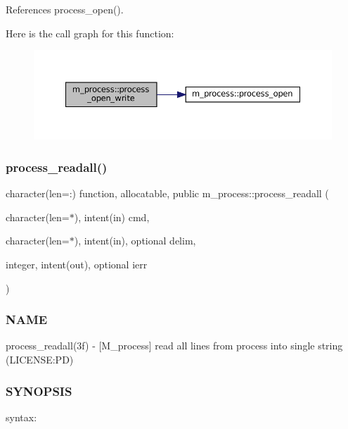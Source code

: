 References process\+\_\+open().

Here is the call graph for this function\+:
\nopagebreak
\begin{figure}[H]
\begin{center}
\leavevmode
\includegraphics[width=350pt]{namespacem__process_aa6ed1404ab3472f5068ed15a7a01defc_cgraph}
\end{center}
\end{figure}
\mbox{\label{namespacem__process_a7dd759a1344789477ae1e205d7fa9a51}} 
\subsubsection{\texorpdfstring{process\+\_\+readall()}{process\_readall()}}
{\footnotesize\ttfamily character(len=\+:) function, allocatable, public m\+\_\+process\+::process\+\_\+readall (\begin{DoxyParamCaption}\item[{character(len=$\ast$), intent(in)}]{cmd,  }\item[{character(len=$\ast$), intent(in), optional}]{delim,  }\item[{integer, intent(out), optional}]{ierr }\end{DoxyParamCaption})}



\subsubsection*{N\+A\+ME}

process\+\_\+readall(3f) -\/ \mbox{[}M\+\_\+process\mbox{]} read all lines from process into single string (L\+I\+C\+E\+N\+SE\+:PD) \subsubsection*{S\+Y\+N\+O\+P\+S\+IS}

syntax\+:

